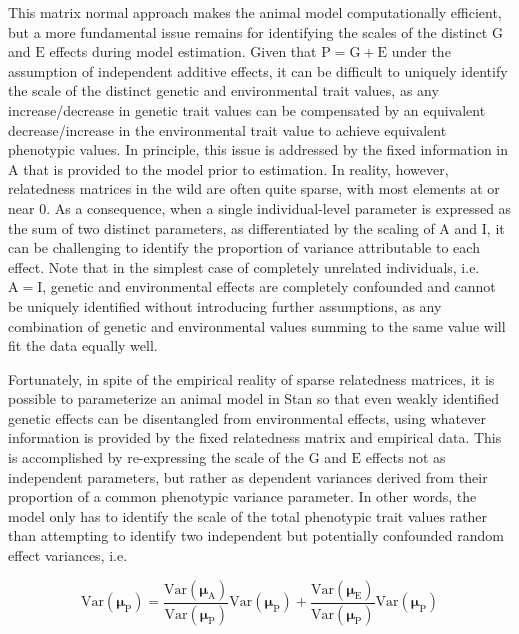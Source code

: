\documentclass[
]{book}
\begin{document}
This matrix normal approach makes the animal model computationally efficient, but a more fundamental issue remains for identifying the scales of the distinct \(\boldsymbol{\mathrm{G}}\) and \(\boldsymbol{\mathrm{E}}\) effects during model estimation. Given that \(\boldsymbol{\mathrm{P}}=\boldsymbol{\mathrm{G}} + \boldsymbol{\mathrm{E}}\) under the assumption of independent additive effects, it can be difficult to uniquely identify the scale of the distinct genetic and environmental trait values, as any increase/decrease in genetic trait values can be compensated by an equivalent decrease/increase in the environmental trait value to achieve equivalent phenotypic values. In principle, this issue is addressed by the fixed information in \(\boldsymbol{\mathrm{A}}\) that is provided to the model prior to estimation. In reality, however, relatedness matrices in the wild are often quite sparse, with most elements at or near 0. As a consequence, when a single individual-level parameter is expressed as the sum of two distinct parameters, as differentiated by the scaling of \(\boldsymbol{\mathrm{A}}\) and \(\boldsymbol{\mathrm{I}}\), it can be challenging to identify the proportion of variance attributable to each effect. Note that in the simplest case of completely unrelated individuals, i.e.~\(\boldsymbol{\mathrm{A}} = \boldsymbol{\mathrm{I}}\), genetic and environmental effects are completely confounded and cannot be uniquely identified without introducing further assumptions, as any combination of genetic and environmental values summing to the same value will fit the data equally well.

Fortunately, in spite of the empirical reality of sparse relatedness matrices, it is possible to parameterize an animal model in Stan so that even weakly identified genetic effects can be disentangled from environmental effects, using whatever information is provided by the fixed relatedness matrix and empirical data. This is accomplished by re-expressing the scale of the \(\boldsymbol{\mathrm{G}}\) and \(\boldsymbol{\mathrm{E}}\) effects not as independent parameters, but rather as dependent variances derived from their proportion of a common phenotypic variance parameter. In other words, the model only has to identify the scale of the total phenotypic trait values rather than attempting to identify two independent but potentially confounded random effect variances, i.e.

\[\mathrm{Var}(\boldsymbol{\mu_\mathrm{P}}) = 
\frac { \mathrm{Var}(\boldsymbol{\mu_{\mathrm{A}}}) }{\mathrm{Var}(\boldsymbol{\mu_{\mathrm{P}}})}\mathrm{Var}(\boldsymbol{\mu_\mathrm{P}}) + 
\frac { \mathrm{Var}(\boldsymbol{\mu_{\mathrm{E}}}) }{\mathrm{Var}(\boldsymbol{\mu_{\mathrm{P}}})}\mathrm{Var}(\boldsymbol{\mu_\mathrm{P}})\]
\end{document}
